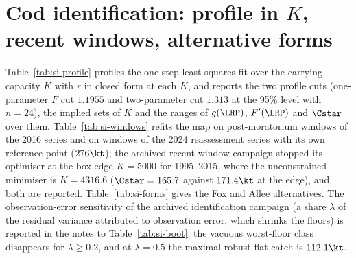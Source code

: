 \section{Cod identification: profile in $K$, recent windows, alternative forms}\label{si:ident}
Table~\ref{tab:si-profile} profiles the one-step least-squares fit over the carrying capacity $K$ with $r$ in closed form at each $K$, and reports the two profile cuts (one-parameter $F$ cut $1.1955$ and two-parameter cut $1.313$ at the 95\% level with $n=24$), the implied sets of $K$ and the ranges of $g(\LRP)$, $F'(\LRP)$ and $\Cstar$ over them. Table~\ref{tab:si-windows} refits the map on post-moratorium windows of the 2016 series and on windows of the 2024 reassessment series with its own reference point ($276\kt$); the archived recent-window campaign stopped its optimiser at the box edge $K=5000$ for 1995--2015, where the unconstrained minimiser is $K=4316.6$ ($\Cstar=165.7$ against $171.4\kt$ at the edge), and both are reported. Table~\ref{tab:si-forms} gives the Fox and Allee alternatives. The observation-error sensitivity of the archived identification campaign (a share $\lambda$ of the residual variance attributed to observation error, which shrinks the floors) is reported in the notes to Table~\ref{tab:si-boot}: the vacuous worst-floor class disappears for $\lambda\ge0.2$, and at $\lambda=0.5$ the maximal robust flat catch is $112.1\kt$.



